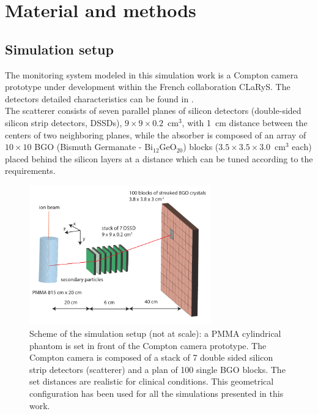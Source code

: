 
\section{Material and methods}

\subsection{Simulation setup}

The monitoring system modeled in this simulation work is a Compton camera prototype under development within the French collaboration CLaRyS. The detectors detailed characteristics can be found in \cite{krimmer:hal-01101334}.\\
The scatterer consists of seven parallel planes of silicon detectors (double-sided silicon strip detectors, DSSDs), $9\times9\times0.2$~cm$^3$, with 1~cm distance between the centers of two neighboring planes, while the absorber is composed of an array of $10\times10$ BGO (Bismuth Germanate - Bi$_{12}$GeO$_{20}$) blocks ($3.5\times3.5\times3.0$~cm$^3$ each) placed behind the silicon layers at a distance which can be tuned according to the requirements.

\begin{figure}	
  \centering
  \includegraphics[width=0.7\textwidth]{./Figure/Compton_Camera_hadontherapy_PMMA_Cylinder_EN.pdf}
  \caption{Scheme of the simulation setup (not at scale): a PMMA cylindrical phantom is set in front of the Compton camera prototype. The Compton camera is composed of a stack of 7 double sided silicon strip detectors (scatterer) and a plan of 100 single BGO blocks. The set distances are realistic for clinical conditions. This geometrical configuration has been used for all the simulations presented in this work.}
  \label{fig:fig_setup_CC_simulation_Hadronth}
\end{figure}

